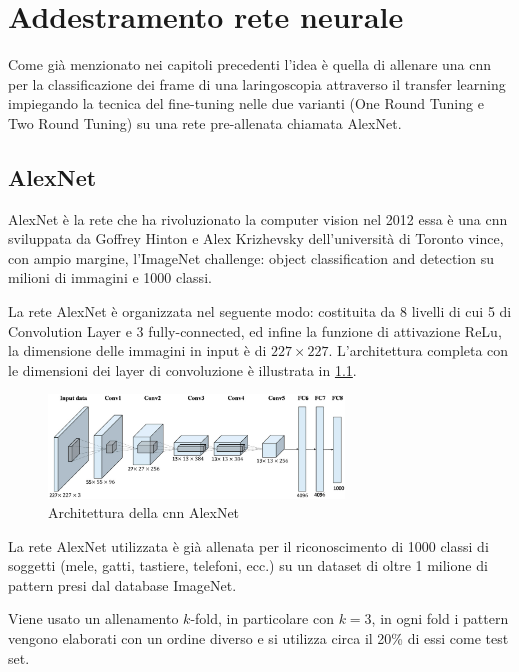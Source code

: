 \chapter{Addestramento rete neurale}\label{addestramento-rete-neurale}


Come già menzionato nei capitoli precedenti l’idea è quella di allenare una \gls{cnn} per la classificazione dei frame di una laringoscopia attraverso il transfer learning impiegando la tecnica del
fine-tuning nelle due varianti (One Round Tuning e Two Round Tuning)  su una rete pre-allenata chiamata AlexNet.

\section{AlexNet}\label{alexnet}
AlexNet è la rete che ha rivoluzionato la computer vision nel 2012 essa è una \gls{cnn} sviluppata
da Goffrey Hinton e Alex Krizhevsky dell’università di Toronto vince, con ampio margine, 
l’ImageNet challenge: object classification and detection su milioni di immagini e 1000 classi.

La rete AlexNet è organizzata nel seguente modo: costituita da 8 livelli di cui 5 di \gls{Convolution Layer} e 3 \gls{fully-connected}, ed infine la funzione
di attivazione \gls{ReLu}, la dimensione delle immagini in input è di \(227\times 227\). L'architettura completa con le dimensioni dei layer di \gls{convoluzione} è illustrata in \cref{fig:alexnet}\cite{alexnet}.  

\begin{figure}[ht]
    \centering
    \includegraphics[width=0.7\textwidth]{addestramento-rete-neurale/alexnet.png}
    \caption{Architettura della \gls{cnn} AlexNet}
    \label{fig:alexnet}
\end{figure}

La rete AlexNet utilizzata è già allenata per il riconoscimento di 1000 classi di soggetti (mele, gatti, tastiere, telefoni, ecc.) su un dataset di oltre 1 milione di pattern presi dal database ImageNet\cite{alexnet}.

Viene usato un allenamento \(k\)-fold, in particolare con \(k=3\), in ogni fold i  pattern vengono elaborati con un
ordine diverso e si utilizza circa il 20\% di essi come test set.

